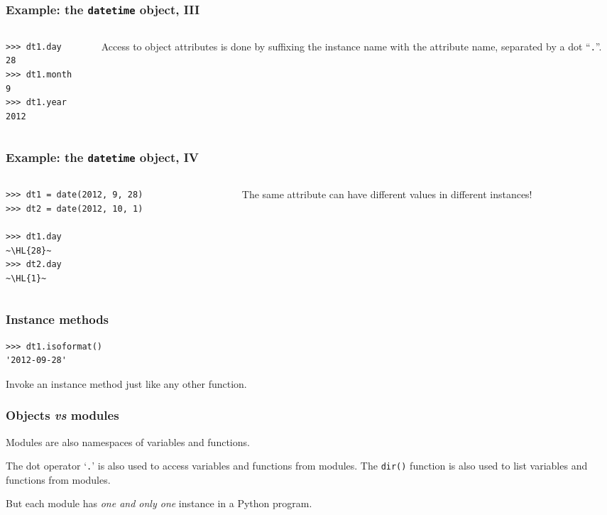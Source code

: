 \documentclass[english,serif,mathserif,xcolor=pdftex,dvipsnames,table]{beamer}
\begin{document}
\begin{frame}[fragile]
  \frametitle{Example: the \texttt{datetime} object, III}
  \begin{columns}[c]
    \begin{column}{0.5\textwidth}
\begin{lstlisting}
>>> dt1.day
28
>>> dt1.month
9
>>> dt1.year
2012
\end{lstlisting}
    \end{column}
    \begin{column}{0.5\textwidth}
      \raggedleft
      Access to object attributes is done by suffixing the
      instance name with the attribute name, separated by a dot
      ``\texttt{.}''.
    \end{column}
  \end{columns}
\end{frame}


\begin{frame}[fragile]
  \frametitle{Example: the \texttt{datetime} object, IV}
  \begin{columns}[c]
    \begin{column}[b]{0.5\textwidth}
\begin{lstlisting}
>>> dt1 = date(2012, 9, 28)
>>> dt2 = date(2012, 10, 1)

>>> dt1.day
~\HL{28}~
>>> dt2.day
~\HL{1}~
\end{lstlisting}
    \end{column}
    \begin{column}[b]{0.5\textwidth}
      \raggedleft
      The same attribute can have different
      values in different instances!
    \end{column}
  \end{columns}
\end{frame}


\begin{frame}[fragile]
  \frametitle{Instance methods}
\begin{lstlisting}[showstringspaces=false]
>>> dt1.isoformat()
'2012-09-28'
\end{lstlisting}

  \+
  Invoke an instance method just like any other function.
\end{frame}


\begin{frame}
  \frametitle{Objects \emph{vs} modules}

  Modules are also namespaces of variables and functions.

  \+
  The dot operator `\texttt{.}' is also used to access variables
  and functions from modules.  The \texttt{dir()} function is also
  used to list variables and functions from modules.

  \+
  But each module has \emph{one and only one} instance in a Python
  program.
\end{frame}
\end{document}
